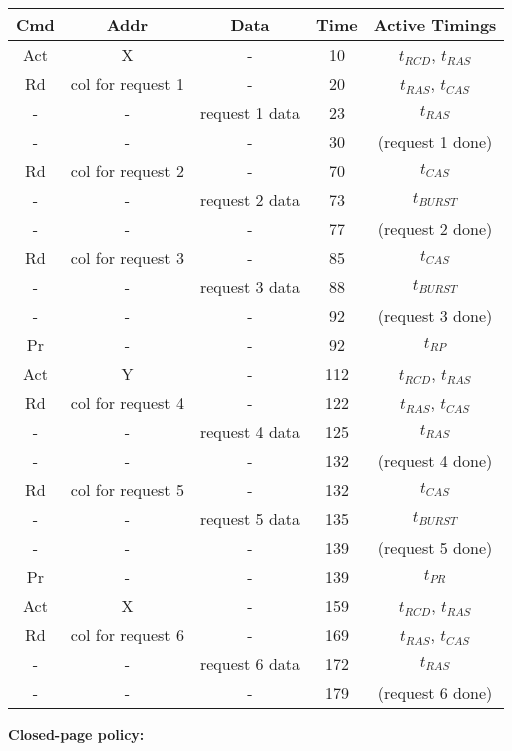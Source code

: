 \documentclass[a4paper, 11pt]{exam}
\begin{document}
\begin{enumerate}
\begin{center}
	\begin{tabular}{|c|c|c|c|c|}
		\hline
		\textbf{Cmd} & \textbf{Addr} & \textbf{Data} & \textbf{Time} & \textbf{Active Timings}\\
		\hline
		Act & X & - & 10 & $t_{RCD}$, $t_{RAS}$\\ 
		\hline
		Rd & col for request 1 & - & 20 &  $t_{RAS}$, $t_{CAS}$\\
		\hline
		- & - & request 1 data & 23 & $t_{RAS}$ \\
		\hline
		- & - & - & 30 & (request 1 done)\\
		\hline
		Rd & col for request 2 & - & 70 & $t_{CAS}$ \\
		\hline
		- & - & request 2 data & 73 & $t_{BURST}$ \\
		\hline
		- & - & - & 77 & (request 2 done) \\
		\hline
		Rd & col for request 3 & - & 85 & $t_{CAS}$ \\
		\hline
		- & - & request 3 data & 88 & $t_{BURST}$ \\
		\hline
		- & - & - & 92 & (request 3 done) \\
		\hline
		Pr & - & - & 92 & $t_{RP}$ \\
		\hline
		Act & Y & - & 112 & $t_{RCD}$, $t_{RAS}$ \\
		\hline
		Rd & col for request 4 & - & 122 & $t_{RAS}$, $t_{CAS}$ \\
		\hline
		- & - & request 4 data & 125 & $t_{RAS}$ \\
		\hline
		- & - & - & 132 & (request 4 done) \\
		\hline
		Rd & col for request 5 & - & 132 & $t_{CAS}$ \\
		\hline
		- & - & request 5 data & 135 & $t_{BURST}$ \\
		\hline
		- & - & - & 139 & (request 5 done) \\
		\hline
		Pr & - & - & 139 & $t_{PR}$ \\
		\hline
		Act & X & - & 159 & $t_{RCD}$, $t_{RAS}$ \\
		\hline
		Rd & col for request 6 & - & 169 & $t_{RAS}$, $t_{CAS}$ \\
		\hline
		- & - & request 6 data & 172 & $t_{RAS}$ \\
		\hline
		- & - & - & 179 & (request 6 done) \\
		\hline
	\end{tabular}
\end{center}

\textbf{Closed-page policy:}


\end{enumerate}
\end{document}
